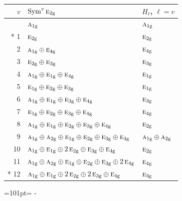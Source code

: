 \documentclass[10pt,a4paper]{article}
\newcommand{\needspace}[1]{\par\penalty-100\begingroup\dimen0=#1\relax\dimen2=\pagegoal
  \advance\dimen2-\pagetotal\ifdim\dimen0>\dimen2\relax\ifdim\dimen2>0pt\vfil\break\fi\fi
  \endgroup}
\numberwithin{equation}{section}
\newcommand{\irr}[1]{\text{\normalfont\scshape #1}}
\newcommand{\ptag}[1]{\mathrm{#1}}
\begin{document}
{\small\begin{longtable}{@{}rll@{}}\toprule
$v$ & $\operatorname{Sym}^{v}\irr{e}_{2\ptag{g}}$ & $H_\ell$, $\ell = v$\\\midrule\endhead
\bottomrule\endfoot\endlastfoot
0 & $\irr{a}_{1\ptag{g}}$ & $\irr{a}_{1\ptag{g}}$\\*
1 & $\irr{e}_{2\ptag{g}}$ & $\irr{e}_{2\ptag{g}}$\\
2 & $\irr{a}_{1\ptag{g}} \oplus \irr{e}_{4\ptag{g}}$ & $\irr{e}_{4\ptag{g}}$\\
3 & $\irr{e}_{2\ptag{g}} \oplus \irr{e}_{3\ptag{g}}$ & $\irr{e}_{3\ptag{g}}$\\
4 & $\irr{a}_{1\ptag{g}} \oplus \irr{e}_{1\ptag{g}} \oplus \irr{e}_{4\ptag{g}}$ & $\irr{e}_{1\ptag{g}}$\\
5 & $\irr{e}_{1\ptag{g}} \oplus \irr{e}_{2\ptag{g}} \oplus \irr{e}_{3\ptag{g}}$ & $\irr{e}_{1\ptag{g}}$\\
6 & $\irr{a}_{1\ptag{g}} \oplus \irr{e}_{1\ptag{g}} \oplus \irr{e}_{3\ptag{g}} \oplus \irr{e}_{4\ptag{g}}$ & $\irr{e}_{3\ptag{g}}$\\
7 & $\irr{e}_{1\ptag{g}} \oplus \irr{e}_{2\ptag{g}} \oplus \irr{e}_{3\ptag{g}} \oplus \irr{e}_{4\ptag{g}}$ & $\irr{e}_{4\ptag{g}}$\\
8 & $\irr{a}_{1\ptag{g}} \oplus \irr{e}_{1\ptag{g}} \oplus \irr{e}_{2\ptag{g}} \oplus \irr{e}_{3\ptag{g}} \oplus \irr{e}_{4\ptag{g}}$ & $\irr{e}_{2\ptag{g}}$\\
9 & $\irr{a}_{1\ptag{g}} \oplus \irr{a}_{2\ptag{g}} \oplus \irr{e}_{1\ptag{g}} \oplus \irr{e}_{2\ptag{g}} \oplus \irr{e}_{3\ptag{g}} \oplus \irr{e}_{4\ptag{g}}$ & $\irr{a}_{1\ptag{g}} \oplus \irr{a}_{2\ptag{g}}$\\
10 & $\irr{a}_{1\ptag{g}} \oplus \irr{e}_{1\ptag{g}} \oplus 2\,\irr{e}_{2\ptag{g}} \oplus \irr{e}_{3\ptag{g}} \oplus \irr{e}_{4\ptag{g}}$ & $\irr{e}_{2\ptag{g}}$\\
11 & $\irr{a}_{1\ptag{g}} \oplus \irr{a}_{2\ptag{g}} \oplus \irr{e}_{1\ptag{g}} \oplus \irr{e}_{2\ptag{g}} \oplus \irr{e}_{3\ptag{g}} \oplus 2\,\irr{e}_{4\ptag{g}}$ & $\irr{e}_{4\ptag{g}}$\\*
12 & $\irr{a}_{1\ptag{g}} \oplus \irr{e}_{1\ptag{g}} \oplus 2\,\irr{e}_{2\ptag{g}} \oplus 2\,\irr{e}_{3\ptag{g}} \oplus \irr{e}_{4\ptag{g}}$ & $\irr{e}_{3\ptag{g}}$\\
\bottomrule\end{longtable}}
\needspace{101pt}
\end{document}
